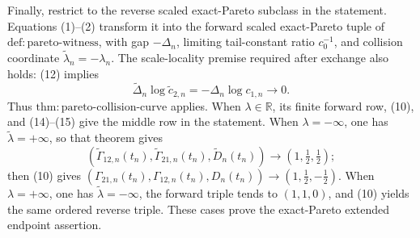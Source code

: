 Finally, restrict to the reverse scaled exact-Pareto subclass in the statement. Equations (1)--(2) transform it into the forward scaled exact-Pareto tuple of \(\mathrm{def{:}pareto\text{-}witness}\), with gap \(-\Delta_n\), limiting tail-constant ratio \(c_0^{-1}\), and collision coordinate \(\widetilde\lambda_n=-\lambda_n\). The scale-locality premise required after exchange also holds: (12) implies
\[
\widetilde\Delta_n\log\widetilde c_{2,n}
=-\Delta_n\log c_{1,n}\longrightarrow0.
\tag{16}
\]
Thus \(\mathrm{thm{:}pareto\text{-}collision\text{-}curve}\) applies. When \(\lambda\in\mathbb R\), its finite forward row, (10), and (14)--(15) give the middle row in the statement. When \(\lambda=-\infty\), one has \(\widetilde\lambda=+\infty\), so that theorem gives
\[
(\widetilde\Gamma_{12,n}(t_n),\widetilde\Gamma_{21,n}(t_n),\widetilde D_n(t_n))
\longrightarrow(1,\tfrac12,\tfrac12);
\]
then (10) gives \((\Gamma_{21,n}(t_n),\Gamma_{12,n}(t_n),D_n(t_n))\longrightarrow(1,\tfrac12,-\tfrac12)\). When \(\lambda=+\infty\), one has \(\widetilde\lambda=-\infty\), the forward triple tends to \((1,1,0)\), and (10) yields the same ordered reverse triple. These cases prove the exact-Pareto extended endpoint assertion.